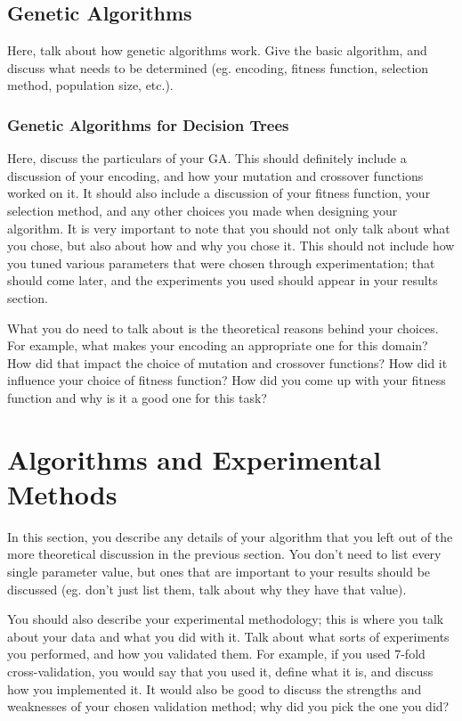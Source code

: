 \documentclass[12pt, letterpaper]{article}
\begin{document}
\subsection{Genetic Algorithms}
Here, talk about how genetic algorithms work.  Give the basic algorithm, and
discuss what needs to be determined (eg. encoding, fitness function, selection
method, population size, etc.).

\subsubsection*{Genetic Algorithms for Decision Trees}
Here, discuss the particulars of your GA.  This should definitely include a
discussion of your encoding, and how your mutation and crossover functions
worked on it.  It should also include a discussion of your fitness function,
your selection method, and any other choices you made when designing your
algorithm.  It is very important to note that you should not only talk about
what you chose, but also about how and why you chose it.  This should not
include how you tuned various parameters that were chosen through
experimentation; that should come later, and the experiments you used should
appear in your results section.

What you do need to talk about is the theoretical reasons behind your choices.
For example, what makes your encoding an appropriate one for this domain?  How
did that impact the choice of mutation and crossover functions?  How did it
influence your choice of fitness function?  How did you come up with your
fitness function and why is it a good one for this task? 

\section{Algorithms and Experimental Methods}

In this section, you describe any details of your algorithm that you left out of
the more theoretical discussion in the previous section.  You don't need to list
every single parameter value, but ones that are important to your results should
be discussed (eg. don't just list them, talk about why they have that value).

You should also describe your experimental methodology; this is where you talk
about your data and what you did with it.  Talk about what sorts of experiments
you performed, and how you validated them.  For example, if you used 7-fold
cross-validation, you would say that you used it, define what it is, and discuss
how you implemented it.  It would also be good to discuss the strengths and
weaknesses of your chosen validation method; why did you pick the one you did?
\end{document}
